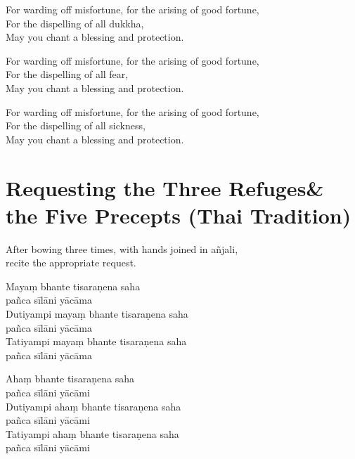 \ifhandbookedition
\enlargethispage{\baselineskip}
\fi

\begin{english}
For warding off misfortune, for the arising of good fortune,\\
For the dispelling of all dukkha,\\
May you chant a blessing and protection.

For warding off misfortune, for the arising of good fortune,\\
For the dispelling of all fear,\\
May you chant a blessing and protection.

For warding off misfortune, for the arising of good fortune,\\
For the dispelling of all sickness,\\
May you chant a blessing and protection.
\end{english}

\clearpage

\section[Three Refuges \& the Five Precepts]{Requesting the Three Refuges\newline \& the Five Precepts (Thai Tradition)}

\label{three-refuges}

\begin{instruction}
  After bowing three times, with hands joined in añjali,\\
  recite the appropriate request.
\end{instruction}

\ifhandbookedition
\enlargethispage{\baselineskip}
\fi


Mayaṃ bhante tisaraṇena saha\\\vin pañca sīlāni yācāma\\
Dutiyampi mayaṃ bhante tisaraṇena saha\\\vin pañca sīlāni yācāma\\
Tatiyampi mayaṃ bhante tisaraṇena saha\\\vin pañca sīlāni yācāma


Ahaṃ bhante tisaraṇena saha\\\vin pañca sīlāni yācāmi\\
Dutiyampi ahaṃ bhante tisaraṇena saha\\\vin pañca sīlāni yācāmi\\
Tatiyampi ahaṃ bhante tisaraṇena saha\\\vin pañca sīlāni yācāmi

